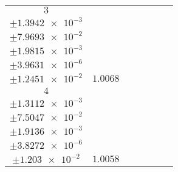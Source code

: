 \documentclass[8pt]{article}
\begin{document}
\begin{longtable}[l]{c c c c c c c}
$\num{3}$ & \begin{tabular}[c]{@{}c@{}}$\num{1.0024}$ \\ $\pm\num{1.3942e-3}$\end{tabular} & \begin{tabular}[c]{@{}c@{}}$\num{9.0623e-2}$ \\ $\pm\num{7.9693e-2}$\end{tabular} & \begin{tabular}[c]{@{}c@{}}$\num{1.8558e+3}$ \\ $\pm\num{1.9815e-3}$\end{tabular} & \begin{tabular}[c]{@{}c@{}}$\num{3.7116}$ \\ $\pm\num{3.9631e-6}$\end{tabular} & \begin{tabular}[c]{@{}c@{}}$\num{7.0281}$ \\ $\pm\num{1.2451e-2}$\end{tabular} & $\num{1.0068}$\\
$\num{4}$ & \begin{tabular}[c]{@{}c@{}}$\num{1.0008}$ \\ $\pm\num{1.3112e-3}$\end{tabular} & \begin{tabular}[c]{@{}c@{}}$\num{5.2478e-2}$ \\ $\pm\num{7.5047e-2}$\end{tabular} & \begin{tabular}[c]{@{}c@{}}$\num{1.8644e+3}$ \\ $\pm\num{1.9136e-3}$\end{tabular} & \begin{tabular}[c]{@{}c@{}}$\num{3.7288}$ \\ $\pm\num{3.8272e-6}$\end{tabular} & \begin{tabular}[c]{@{}c@{}}$\num{7.0007}$ \\ $\pm\num{1.203e-2}$\end{tabular} & $\num{1.0058}$\\
\bottomrule
\end{longtable}
\end{document}
